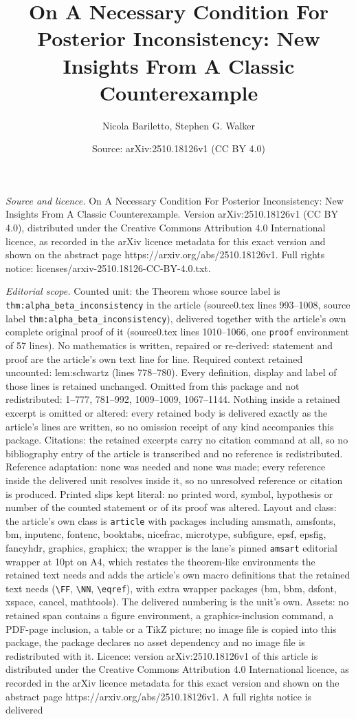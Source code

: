 \documentclass[10pt,a4paper]{amsart}
\title[On A Necessary Condition For Posterior Inconsistency: New In]{On A Necessary Condition For Posterior Inconsistency: New Insights From A Classic Counterexample}
\author{Nicola Bariletto, Stephen G. Walker}
\date{Source: arXiv:2510.18126v1 (CC BY 4.0)}
\begin{document}
\maketitle

\noindent\emph{Source and licence.} On A Necessary Condition For Posterior Inconsistency: New Insights From A Classic Counterexample. Version arXiv:2510.18126v1 (CC BY 4.0), distributed under the Creative Commons Attribution 4.0 International licence, as recorded in the arXiv licence metadata for this exact version and shown on the abstract page https://arxiv.org/abs/2510.18126v1. Full rights notice: licenses/arxiv-2510.18126-CC-BY-4.0.txt.\par\smallskip

\noindent\textit{Editorial scope.} Counted unit: the Theorem whose source label is \texttt{thm:alpha\_beta\_inconsistency} in the article (source0.tex lines 993--1008, source label \texttt{thm:alpha\_beta\_inconsistency}), delivered together with the article's own complete original proof of it (source0.tex lines 1010--1066, one \texttt{proof} environment of 57 lines). No mathematics is written, repaired or re-derived: statement and proof are the article's own text line for line. Required context retained uncounted: lem:schwartz (lines 778--780). Every definition, display and label of those lines is retained unchanged. Omitted from this package and not redistributed: 1--777, 781--992, 1009--1009, 1067--1144. Nothing inside a retained excerpt is omitted or altered: every retained body is delivered exactly as the article's lines are written, so no omission receipt of any kind accompanies this package. Citations: the retained excerpts carry no citation command at all, so no bibliography entry of the article is transcribed and no reference is redistributed. Reference adaptation: none was needed and none was made; every reference inside the delivered unit resolves inside it, so no unresolved reference or citation is produced. Printed slips kept literal: no printed word, symbol, hypothesis or number of the counted statement or of its proof was altered. Layout and class: the article's own class is \texttt{article} with packages including amsmath, amsfonts, bm, inputenc, fontenc, booktabs, nicefrac, microtype, subfigure, epsf, epsfig, fancyhdr, graphics, graphicx; the wrapper is the lane's pinned \texttt{amsart} editorial wrapper at 10pt on A4, which restates the theorem-like environments the retained text needs and adds the article's own macro definitions that the retained text needs (\texttt{\textbackslash FF}, \texttt{\textbackslash NN}, \texttt{\textbackslash eqref}), with extra wrapper packages (bm, bbm, dsfont, xspace, cancel, mathtools). The delivered numbering is the unit's own. Assets: no retained span contains a figure environment, a graphics-inclusion command, a PDF-page inclusion, a table or a TikZ picture; no image file is copied into this package, the package declares no asset dependency and no image file is redistributed with it. Licence: version arXiv:2510.18126v1 of this article is distributed under the Creative Commons Attribution 4.0 International licence, as recorded in the arXiv licence metadata for this exact version and shown on the abstract page https://arxiv.org/abs/2510.18126v1. A full rights notice is delivered 
\end{document}
